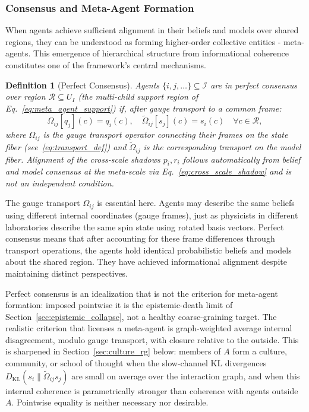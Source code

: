 \documentclass[11pt]{article}
\newtheorem{definition}{Definition}
\begin{document}
\subsubsection{Consensus and Meta-Agent Formation}

When agents achieve sufficient alignment in their beliefs and models over shared regions, they can be understood as forming higher-order collective entities - meta-agents. This emergence of hierarchical structure from informational coherence constitutes one of the framework's central mechanisms.

\begin{definition}[Perfect Consensus]
Agents $\{i, j, \ldots\} \subseteq \mathcal{I}$ are in perfect consensus over region $\mathcal{R} \subseteq U_I$ (the multi-child support region of Eq.~\eqref{eq:meta_agent_support}) if, after gauge transport to a common frame:
\begin{equation}
\Omega_{ij}[q_j](c) = q_i(c), \quad \tilde{\Omega}_{ij}[s_j](c) = s_i(c) \quad \forall c \in \mathcal{R},
\end{equation}
where $\Omega_{ij}$ is the gauge transport operator connecting their frames on the state fiber (see~\eqref{eq:transport_def}) and $\tilde{\Omega}_{ij}$ is the corresponding transport on the model fiber. Alignment of the cross-scale shadows $p_i, r_i$ follows automatically from belief and model consensus at the meta-scale via Eq.~\eqref{eq:cross_scale_shadow} and is not an independent condition.
\end{definition}

The gauge transport $\Omega_{ij}$ is essential here. Agents may describe the same beliefs using different internal coordinates (gauge frames), just as physicists in different laboratories describe the same spin state using rotated basis vectors. Perfect consensus means that after accounting for these frame differences through transport operations, the agents hold identical probabilistic beliefs and models about the shared region. They have achieved informational alignment despite maintaining distinct perspectives.

Perfect consensus is an idealization that is not the criterion for meta-agent formation: imposed pointwise it is the epistemic-death limit of Section~\ref{sec:epistemic_collapse}, not a healthy coarse-graining target. The realistic criterion that licenses a meta-agent is graph-weighted average internal disagreement, modulo gauge transport, with closure relative to the outside. This is sharpened in Section~\ref{sec:culture_rg} below: members of $A$ form a culture, community, or school of thought when the slow-channel KL divergences $D_{\mathrm{KL}}(s_i \| \tilde\Omega_{ij} s_j)$ are small on average over the interaction graph, and when this internal coherence is parametrically stronger than coherence with agents outside $A$. Pointwise equality is neither necessary nor desirable.
\end{document}

